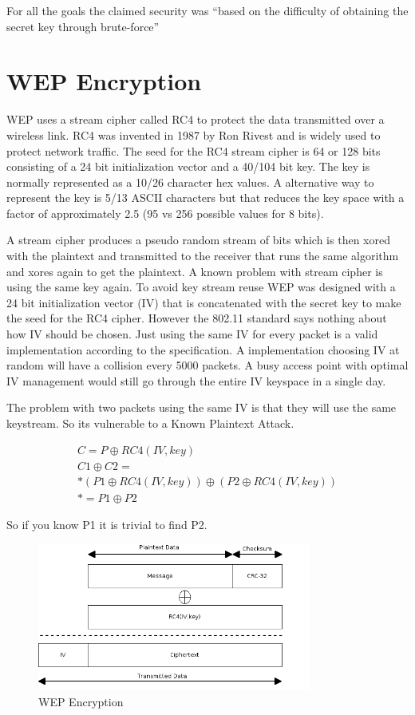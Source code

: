 \documentclass[twocolumn,11pt]{IEEEtran}
\begin{document}
For all the goals the claimed security was ``based on the difficulty of obtaining the secret key through brute-force''\cite{IEEE:Fast}



\section {WEP Encryption}
\label{sec:WEP_Encryption}

WEP uses a stream cipher called RC4 to protect the data transmitted over a wireless link. RC4 was invented in 1987 by Ron Rivest and is widely used to protect network traffic. The seed for the RC4 stream cipher is 64 or 128 bits consisting of a 24 bit initialization vector and a 40/104 bit key. The key is normally represented as a 10/26 character hex values. A alternative way to represent the key is 5/13 ASCII characters but that reduces the key space with a factor of approximately 2.5 (95 vs 256 possible values for 8 bits).

A stream cipher produces a pseudo random stream of bits which is then xored with the plaintext and transmitted to the receiver that runs the same algorithm and xores again to get the plaintext. A known problem with stream cipher is using the same key again. To avoid key stream reuse WEP was designed with a 24 bit initialization vector (IV) that is concatenated with the secret key to make the seed for the RC4 cipher. However the 802.11 standard says nothing about how IV should be chosen. Just using the same IV for every packet is a valid implementation according to the specification. A implementation choosing IV at random will have a collision every 5000 packets\cite{Borisov:New}. A busy access point with optimal IV management would still go through the entire IV keyspace in a single day.

The problem with two packets using the same IV is that they will use the same keystream. So its vulnerable to a Known Plaintext Attack.


\begin{align*}
C = P \oplus RC4(IV,key) \\
C1 \oplus C2 = \\*
(P1 \oplus RC4(IV,key) ) \oplus ( P2 \oplus RC4(IV,key)) \\*
= P1 \oplus P2
\end{align*}

So if you know P1 it is trivial to find P2. 

\begin{figure}
\includegraphics[width=90mm]{WEP_Encryption.png}
\caption{WEP Encryption}
\end{figure}
\end{document}
